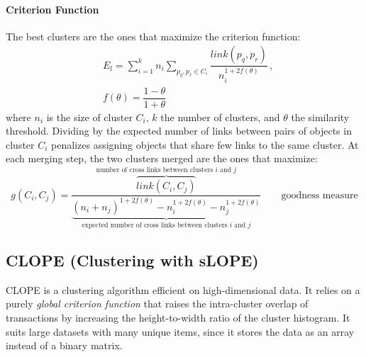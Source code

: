 \paragraph{Criterion Function}
The best clusters are the ones that maximize the criterion function:
\begin{align*}
    &E_l = \sum_{i=1}^k n_i \sum_{p_q,p_r \in C_i} \dfrac{link(p_q, p_r)}{n_i^{1 + 2 f(\theta)}} \,, \\
    & f(\theta) = \dfrac{1-\theta}{1+\theta}
\end{align*}
where $n_i$ is the size of cluster $C_i$, $k$ the number of clusters, and $\theta$ the similarity threshold. Dividing by the expected number of links between pairs of objects in cluster $C_i$ penalizes assigning objects that share few links to the same cluster. At each merging step, the two clusters merged are the ones that maximize:
\begin{equation*}
    g(C_i, C_j) = \frac{\overbrace{link(C_i, C_j)}^\text{number of cross links between clusters $i$ and $j$}}{\underbrace{(n_i + n_j)^{1+2f(\theta)} - n_i^{1+2f(\theta)} - n_j^{1+2f(\theta)}}_{\text{expected number of cross links between clusters $i$ and $j$}}} \qquad \text{goodness measure}
\end{equation*}

\subsection{CLOPE (Clustering with sLOPE)}

CLOPE is a clustering algorithm efficient on high-dimensional data. It relies on a purely \textit{global criterion function} that raises the intra-cluster overlap of transactions by increasing the height-to-width ratio of the cluster histogram. It suits large datasets with many unique items, since it stores the data as an array instead of a binary matrix.


